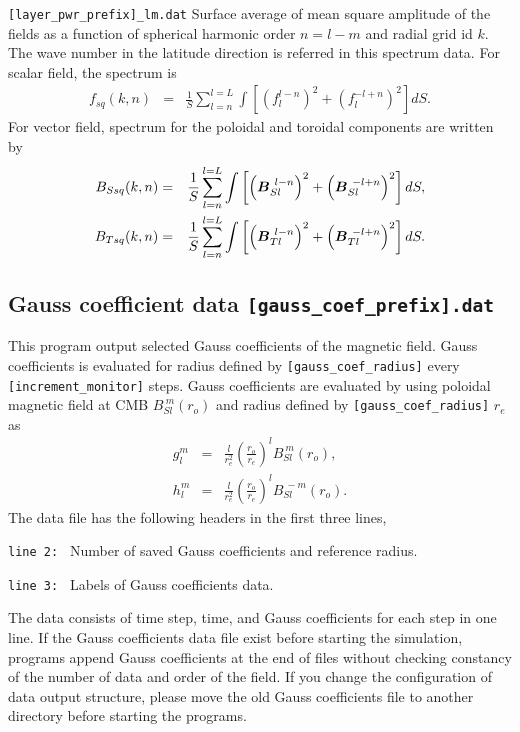 \begin{description}
\item{\tt [layer\_pwr\_prefix]\_lm.dat} Surface average of mean square amplitude of the fields as a function of spherical harmonic order $n = l-m$ and radial grid id $k$. The wave number in the latitude direction is referred in this spectrum data. For scalar field, the spectrum is
\begin{eqnarray}
f_{sq}(k,n) &=& \frac{1}{S} \sum_{l=n}^{l=L} \int \left[ \left(f_{l}^{l-n}\right)^{2} + \left(f_{l}^{-l+n}\right)^2 \right] dS.
\nonumber
\end{eqnarray}
For vector field, spectrum for the poloidal and toroidal components are written by 
\begin{eqnarray}
B_{Ssq}(k,n) &=& \frac{1}{S} \sum_{l=n}^{l=L} \int  \left[\left(\mbox{\boldmath$B$}_{Sl}^{\ l-n} \right)^{2} 
 + \left(\mbox{\boldmath$B$}_{Sl}^{\ -l+n} \right)^{2}  \right] dS,
\nonumber \\
B_{Tsq}(k,n) &=& \frac{1}{S} \sum_{l=n}^{l=L} \int \left[\left(\mbox{\boldmath$B$}_{Tl}^{\ l-n} \right)^{2} 
 + \left(\mbox{\boldmath$B$}_{Tl}^{\ -l+n} \right)^{2}  \right] dS.
\nonumber
\end{eqnarray}

\end{description}
%

\subsection{Gauss coefficient data {\tt [gauss\_coef\_prefix].dat}}
This program output selected Gauss coefficients of the magnetic field. Gauss coefficients is evaluated for radius defined by \verb|[gauss_coef_radius]| every \verb|[increment_monitor]| steps. Gauss coefficients are evaluated by using poloidal magnetic field at CMB $B_{Sl}^{\ m}(r_{o})$ and radius defined by \verb|[gauss_coef_radius]| $r_{e}$ as
%
\begin{eqnarray}
g_{l}^{m} &=& \frac{l}{r_{e}^2} \left(\frac{r_{o}}{r_{e}}\right)^{l} B_{Sl}^{\ m}(r_{o}),
\nonumber \\
h_{l}^{m} &=& \frac{l}{r_{e}^2} \left(\frac{r_{o}}{r_{e}}\right)^{l} B_{Sl}^{\ -m}(r_{o}).
\nonumber
\end{eqnarray}
%
The data file has the following headers in the first three lines,
%
\begin{description}
\item{\tt  line 2: } Number of saved Gauss coefficients and reference radius.
\item{\tt  line 3: } Labels of Gauss coefficients data.
\end{description}
%
The data consists of time step, time, and Gauss coefficients for each step in one line. If the Gauss coefficients data file exist before starting the simulation, programs append Gauss coefficients at the end of files without checking constancy of the number of data and order of the field. If you change the configuration of data output structure, please move the old Gauss coefficients file to another directory before starting the programs.

